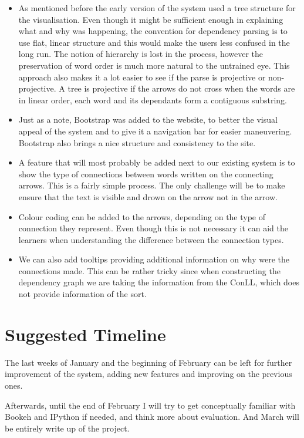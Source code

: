 \documentclass[bsc,frontabs,twoside,singlespacing,parskip,deptrepor]{infthesis}
\begin{document}
\begin{itemize}
\item As mentioned before the early version of the system used a tree structure for the visualisation. Even though it might be sufficient enough in explaining what and why was happening, the convention for dependency parsing is to use flat, linear structure and this would make the users less confused in the long run. The notion of hierarchy is lost in the process, however the preservation of word order is much more natural to the untrained eye. This approach also makes it a lot easier to see if the parse is projective or non-projective. A tree is projective if the arrows do not cross when the words are in linear order, each word and its dependants form a contiguous substring. 

\item Just as a note, Bootstrap was added to the website, to better the visual appeal of the system and to give it a navigation bar for easier maneuvering. Bootstrap also brings a nice structure and consistency to the site.  

\item A feature that will most probably be added next to our existing system is to show the type of connections between words written on the connecting arrows. This is a fairly simple process. The only challenge will be to make ensure that the text is visible and drown on the arrow not in the arrow.

\item Colour coding can be added to the arrows, depending on the type of connection they represent. Even though this is not necessary it can aid the learners when understanding the difference between the connection types.

\item We can also add tooltips providing additional information on why were the connections made. This can be rather tricky since when constructing the dependency graph we are taking the information from the ConLL, which does not provide information of the sort.
\end{itemize}

\section{Suggested Timeline}
The last weeks of January and the beginning of February can be left for further improvement of the system, adding new features and improving on the previous ones.

Afterwards, until the end of February I will try to get conceptually familiar with Bookeh and IPython if needed, and think more about evaluation. And March will be entirely write up of the project.
  



\end{document}
